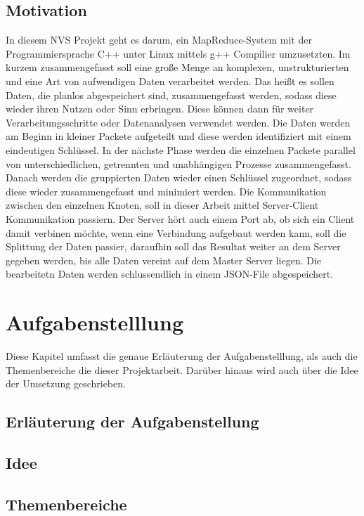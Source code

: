 \documentclass[a4paper,12pt]{article}
\begin{document}
\subsection{Motivation}
In diesem NVS Projekt geht es darum, ein MapReduce-System mit der Programmiersprache C++ unter Linux mittels g++ Compilier umzusetzten.
Im kurzem zusammengefasst soll eine große Menge an komplexen, unstrukturierten und eine Art von aufwendigen Daten verarbeitet werden. 
Das heißt es sollen Daten, die planlos abgespeichert sind, zusammengefasst werden, sodass diese wieder ihren Nutzen oder Sinn erbringen. Diese können
dann für weiter Verarbeitungsschritte oder Datenanalysen verwendet werden. Die Daten werden am Beginn in kleiner Packete aufgeteilt und diese werden identifiziert mit einem eindeutigen
Schlüssel. In der nächste Phase werden die einzelnen Packete parallel von unterschiedlichen, getrennten und unabhängigen Prozesse zusammengefasst. Danach werden die gruppierten Daten wieder 
einen Schlüssel zugeordnet, sodass diese wieder zusammengefasst und minimiert werden. Die Kommunikation zwischen den einzelnen Knoten, soll in dieser Arbeit mittel Server-Client Kommunikation passiern.
Der Server hört auch einem Port ab, ob sich ein Client damit verbinen möchte, wenn eine Verbindung aufgebaut werden kann, soll die Splittung der Daten passier, daraufhin soll das Resultat weiter an dem Server gegeben werden, bis 
alle Daten vereint auf dem Master Server liegen. Die bearbeitetn Daten werden schlussendlich in einem JSON-File abgespeichert.
\section{Aufgabenstelllung}
Diese Kapitel umfasst die genaue Erläuterung der Aufgabenstelllung, als auch die Themenbereiche die dieser Projektarbeit. Darüber hinaus wird auch über die Idee der Umsetzung geschrieben.

\subsection{Erläuterung der Aufgabenstellung}

\subsection{Idee}

\subsection{Themenbereiche}
\newpage
\end{document}
